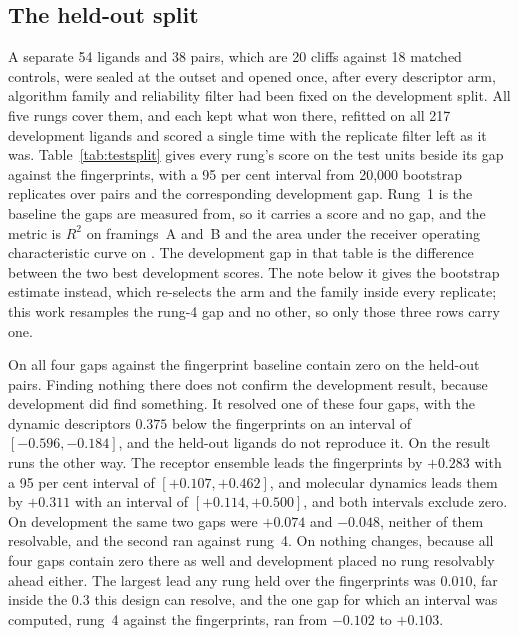 \subsection{The held-out split}\label{sec:testsplit}

A separate 54 ligands and 38 pairs, which are 20 cliffs against 18 matched controls,
were sealed at the outset and opened once, after every descriptor arm, algorithm
family and reliability filter had been fixed on the development split. All five rungs
cover them, and each kept what won there, refitted on all 217 development ligands and
scored a single time with the replicate filter left as it was.
Table~\ref{tab:testsplit} gives every rung's score on the test units beside its gap
against the fingerprints, with a 95 per cent interval from 20{,}000 bootstrap
replicates over pairs and the corresponding development gap. Rung~1 is the baseline the gaps are measured from, so it carries a score and no gap,
and the metric is $R^2$ on framings~A and~B and the area under the receiver operating
characteristic curve on \framingC{}. The development gap in that table is the difference between the two best development
scores. The note below it gives the bootstrap estimate instead, which re-selects the arm
and the family inside every replicate; this work resamples the rung-4 gap and no
other, so only those three rows carry one.

On \framingA{} all four gaps against the fingerprint baseline contain zero on the
held-out pairs. Finding nothing there does not confirm the development result, because
development did find something. It resolved one of these four gaps, with the dynamic descriptors $0.375$ below the
fingerprints on an interval of $[-0.596, -0.184]$, and the held-out ligands do not
reproduce it. On
\framingB{} the result runs the other way. The receptor ensemble leads the
fingerprints by $+0.283$ with a 95 per cent interval of $[+0.107, +0.462]$, and
molecular dynamics leads them by $+0.311$ with an interval of $[+0.114, +0.500]$, and
both intervals exclude zero. On development the same two gaps were $+0.074$ and
$-0.048$, neither of them resolvable, and the second ran against rung~4. On
\framingC{} nothing changes, because all four gaps contain zero there as well and
development placed no rung resolvably ahead either. The largest lead any rung held over the
fingerprints was $0.010$, far inside the $0.3$ this design can resolve, and the one
gap for which an interval was computed, rung~4 against the fingerprints, ran from
$-0.102$ to $+0.103$.


